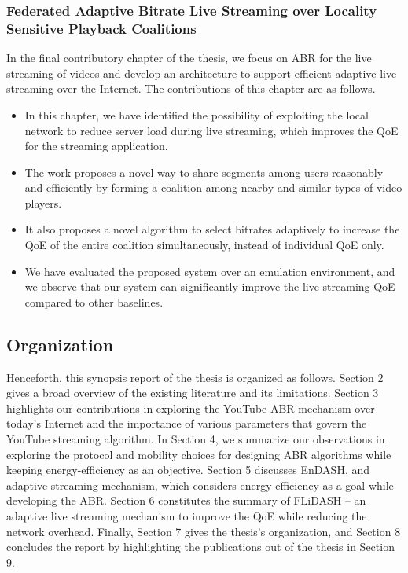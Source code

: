 \subsubsection{Federated Adaptive Bitrate Live Streaming over Locality Sensitive Playback Coalitions}
In the final contributory chapter of the thesis, we focus on ABR for the live streaming of videos and develop an architecture to support efficient adaptive live streaming over the Internet. The contributions of this chapter are as follows. 
\begin{itemize}
	\item In this chapter, we have identified the possibility of exploiting the local network to reduce server load during live streaming, which improves the QoE for the streaming application.
	\item The work proposes a novel way to share segments among users reasonably and efficiently by forming a coalition among nearby and similar types of video players.
	\item It also proposes a novel algorithm to select bitrates adaptively to increase the QoE of the entire coalition simultaneously, instead of individual QoE only.
	\item We have evaluated the proposed system over an emulation environment, and we observe that our system can significantly improve the live streaming QoE compared to other baselines. 
\end{itemize}

\subsection{Organization}

Henceforth, this synopsis report of the thesis is organized as follows. Section 2 gives a broad overview of the existing literature and its limitations. Section 3 highlights our contributions in exploring the YouTube ABR mechanism over today's Internet and the importance of various parameters that govern the YouTube streaming algorithm. In Section 4, we summarize our observations in exploring the protocol and mobility choices for designing ABR algorithms while keeping energy-efficiency as an objective. Section  5 discusses EnDASH, and adaptive streaming mechanism, which considers energy-efficiency as a goal while developing the ABR. Section 6 constitutes the summary of FLiDASH -- an adaptive live streaming mechanism to improve the QoE while reducing the network overhead. Finally, Section 7 gives the thesis's organization, and Section 8 concludes the report by highlighting the publications out of the thesis in Section 9.  


